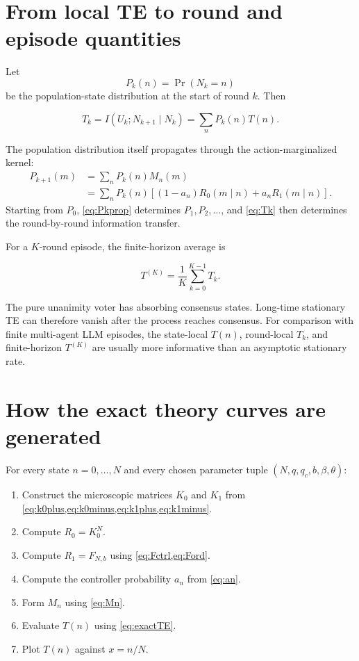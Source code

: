 \documentclass[11pt,a4paper]{article}
\newcommand{\Prb}{\operatorname{Pr}}
\newcommand{\1}{\mathbbm{1}}
\begin{document}
\section{From local TE to round and episode quantities}

Let
\[
P_k(n)=\Prb(N_k=n)
\]
be the population-state distribution at the start of round $k$. Then
\begin{resultbox}
\begin{equation}
\boxed{
T_k
=I(U_k;N_{k+1}\mid N_k)
=\sum_n P_k(n)T(n).}
\label{eq:Tk}
\end{equation}
\end{resultbox}

The population distribution itself propagates through the action-marginalized kernel:
\begin{align}
P_{k+1}(m)
&=\sum_n P_k(n)M_n(m)\\
&=\sum_n P_k(n)
\left[(1-a_n)R_0(m\mid n)+a_nR_1(m\mid n)\right].
\label{eq:Pkprop}
\end{align}
Starting from $P_0$, \cref{eq:Pkprop} determines $P_1,P_2,\ldots$, and \cref{eq:Tk} then determines the round-by-round information transfer.

For a $K$-round episode, the finite-horizon average is
\begin{resultbox}
\begin{equation}
\boxed{
T^{(K)}=\frac1K\sum_{k=0}^{K-1}T_k.}
\label{eq:TK}
\end{equation}
\end{resultbox}

\begin{warningbox}
The pure unanimity voter has absorbing consensus states. Long-time stationary TE can therefore vanish after the process reaches consensus. For comparison with finite multi-agent LLM episodes, the state-local $T(n)$, round-local $T_k$, and finite-horizon $T^{(K)}$ are usually more informative than an asymptotic stationary rate.
\end{warningbox}

\section{How the exact theory curves are generated}

For every state $n=0,\ldots,N$ and every chosen parameter tuple $(N,q,q_c,b,\beta,\theta)$:
\begin{enumerate}[leftmargin=1.7em]
\item Construct the microscopic matrices $K_0$ and $K_1$ from \cref{eq:k0plus,eq:k0minus,eq:k1plus,eq:k1minus}.
\item Compute $R_0=K_0^N$.
\item Compute $R_1=F_{N,b}$ using \cref{eq:Fctrl,eq:Ford}.
\item Compute the controller probability $a_n$ from \cref{eq:an}.
\item Form $M_n$ using \cref{eq:Mn}.
\item Evaluate $T(n)$ using \cref{eq:exactTE}.
\item Plot $T(n)$ against $x=n/N$.
\end{enumerate}
\end{document}

